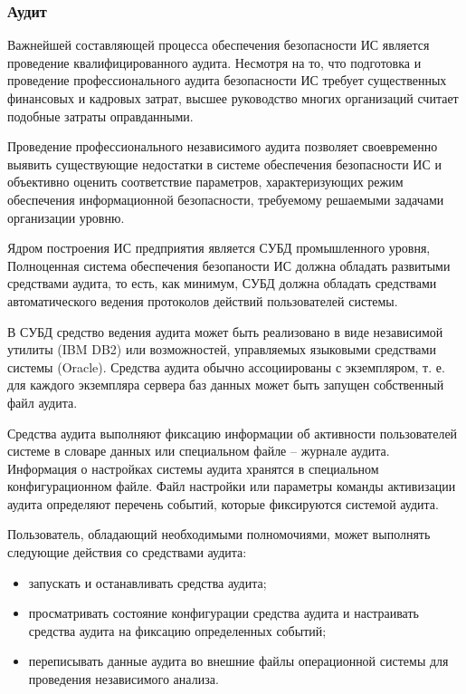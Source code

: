 \subsubsection{Аудит}
Важнейшей составляющей процесса обеспечения безопасности ИС является проведение квалифицированного аудита. Несмотря на то, что подготовка и проведение профессионального аудита безопасности ИС требует существенных финансовых и кадровых затрат, высшее руководство многих организаций считает подобные затраты оправданными.

Проведение профессионального независимого аудита позволяет своевременно выявить существующие недостатки в системе обеспечения безопасности ИС и объективно оценить соответствие параметров, характеризующих режим обеспечения информационной безопасности, требуемому решаемыми задачами организации уровню.

Ядром построения ИС предприятия является СУБД промышленного уровня, Полноценная система обеспечения безопаности ИС должна обладать развитыми средствами аудита, то есть, как минимум, СУБД должна обладать средствами автоматического ведения протоколов действий пользователей системы.

В СУБД средство ведения аудита может быть реализовано в виде независимой утилиты (IBM DB2) или возможностей, управляемых языковыми средствами системы (Oracle). Средства аудита обычно ассоциированы с экземпляром, т. е. для каждого экземпляра сервера баз данных может быть запущен собственный файл аудита.

Средства аудита выполняют фиксацию информации об активности пользователей системе в словаре данных или специальном файле – журнале аудита. Информация о настройках системы аудита хранятся в специальном конфигурационном файле. Файл настройки или параметры команды активизации аудита определяют перечень событий, которые фиксируются системой аудита.

Пользователь, обладающий необходимыми полномочиями, может выполнять следующие действия со средствами аудита:
\begin{itemize}
	\item запускать и останавливать средства аудита;
	\item просматривать состояние конфигурации средства аудита и настраивать средства аудита на фиксацию определенных событий;
	\item переписывать данные аудита во внешние файлы операционной системы для проведения независимого анализа.
\end{itemize}

